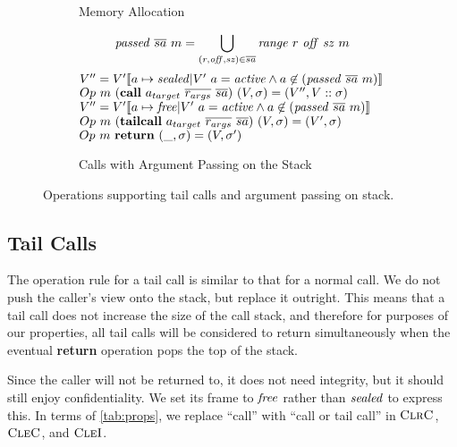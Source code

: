 \documentclass[10pt,conference]{ieeetran}%
\theoremstyle{definition}
\begin{document}
\begin{figure*}
\begin{subfigure}{0.4\textwidth}
    \caption{Memory Allocation}
    \label{sfig:publicalloc}
  \end{subfigure}
  \begin{subfigure}{0.6\textwidth}
    \[\mathit{passed} ~ \overline{sa} ~ m = \bigcup_{(r,\mathit{off},\mathit{sz}) \in \overline{sa}}
    \mathit{range} ~ r ~ \mathit{off} ~ \mathit{sz} ~ m\]
               {\(V'' = V'\llbracket a \mapsto \mathit{sealed} | V' ~ a = \mathit{active} \land a \not \in (\mathit{passed} ~ \overline{sa} ~ m) \rrbracket\)}
               {\(Op ~ m ~ (\mathbf{call} ~ a_{target} ~ \overline{r_{args}} ~ \overline{sa})
                 ~ (V,\sigma) = (V'',V::\sigma)\)}
               {\(V'' = V'\llbracket a \mapsto \mathit{free} | V' ~ a = \mathit{active} \land a \not \in (\mathit{passed} ~ \overline{sa} ~ m) \rrbracket\)}
               {\(Op ~ m ~ (\mathbf{tail call} ~ a_{target} ~ \overline{r_{args}} ~ \overline{sa})
                 ~ (V,\sigma) = (V',\sigma)\)}
             {\(Op ~ m ~ \mathbf{return} ~ (\_, \sigma) = (V, \sigma')\)}

    \caption{Calls with Argument Passing on the Stack}
    \label{sfig:stkargs}
  \end{subfigure}
  \caption{Operations supporting tail calls and argument passing on stack.}
  \label{fig:advops}
\end{figure*}

\subsection{Tail Calls}

The operation rule for a tail call is similar to that for a normal call.
We do not push the caller's view onto the stack,
but replace it outright. This means that a tail call does not increase the size of
the call stack, and therefore for purposes of our properties, all tail
calls will
be considered to return simultaneously when the eventual {\bf return} operation
pops the top of the stack.

Since the caller will not be returned to, it does not need integrity, but
it should still enjoy confidentiality. We set its frame to \(\mathit{free}\) rather
than \(\mathit{sealed}\) to express this. In terms of \cref{tab:props}, we replace
``call'' with ``call or tail call'' in \(\textnormal{\sc ClrC}\), \(\textnormal{\sc CleC}\), and \(\textnormal{\sc CleI}\).
\end{document}
